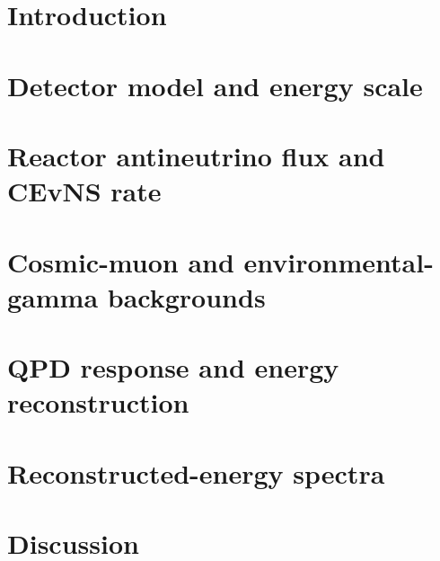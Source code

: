 \documentclass[aps,prd,twocolumn,superscriptaddress,nofootinbib]{revtex4-2}
\begin{document}
\maketitle

\section{Introduction}
\label{sec:intro}

\section{Detector model and energy scale}
\label{sec:model}

\section{Reactor antineutrino flux and CEvNS rate}
\label{sec:cevns}

\section{Cosmic-muon and environmental-gamma backgrounds}
\label{sec:backgrounds}

\section{QPD response and energy reconstruction}
\label{sec:response}

\section{Reconstructed-energy spectra}
\label{sec:results}

\section{Discussion}
\label{sec:discussion}

\end{document}
